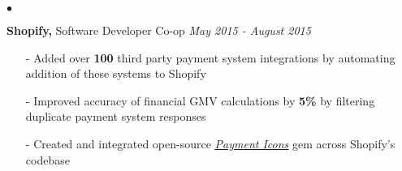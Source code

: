 \documentclass[11pt]{article}
\newenvironment{achievements}{\begin{list}{$\bullet$}{\topsep 0pt \itemsep -1.5pt \leftmargin 5pt}}{\vspace*{4pt}\end{list}}
\begin{document}
\begin{achievements}
\vspace{7pt}

\item \textbf{Shopify,} Software Developer Co-op \hfill \textit {May 2015 - August 2015}
\vspace{2pt}
\begin{itemize}
\item[-] Added over \textbf{100} third party payment system integrations by automating addition of these systems to Shopify
\vspace{2pt}
\item[-] Improved accuracy of financial GMV calculations by \textbf{5\%} by filtering duplicate payment system responses
\vspace{2pt}
\item[-] Created and integrated open-source \underline{\textit{\href{https://rubygems.org/gems/payment_icons}{Payment Icons}}} gem across Shopify's codebase

\end{itemize}
\end{achievements}

\vspace{9pt}
\end{document}
